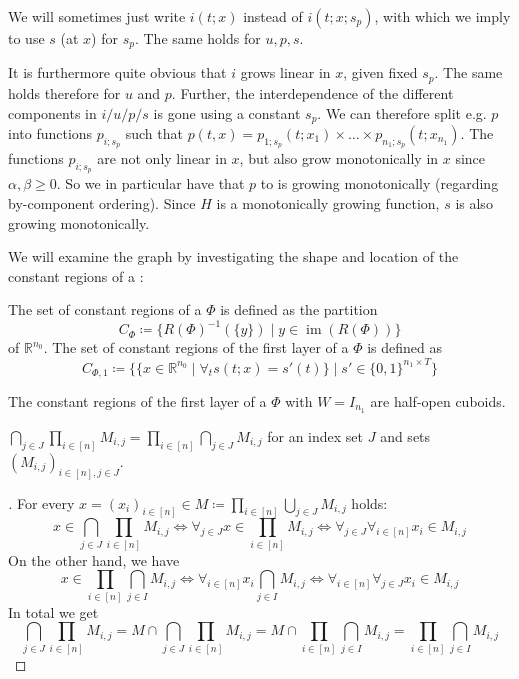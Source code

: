 \begin{remark}\label{rem:regions-non-recursive-defs}
  We will sometimes just write \(i(t;x)\) instead of \(i(t;x;s_p)\), with which we imply to use \(s\) (at \(x\)) for \(s_p\). The same holds for \(u,p,s\).

  It is furthermore quite obvious that \(i\) grows linear in \(x\), given fixed \(s_p\). The same holds therefore for \(u\) and \(p\). Further, the interdependence of the different components in \(i/u/p/s\) is gone using a constant \(s_p\). We can therefore split e.g. \(p\) into functions \(p_{i;s_p}\) such that \(p(t,x)=p_{1;s_p}(t;x_1)×…×p_{n_1;s_p}(t;x_{n_1})\).
  The functions \(p_{i;s_p}\) are not only linear in \(x\), but also grow monotonically in \(x\) since \(α,β≥0\).
  So we in particular have that \(p\) to is growing monotonically (regarding by-component ordering).
  Since \(H\) is a monotonically growing function, \(s\) is also growing monotonically.
\end{remark}
We will examine the graph by investigating the shape and location of the constant regions of a \dtlifsnn:

\begin{definition}
  The set of constant regions of a \dtlifsnn \(Φ\) is defined as the partition
  \[ C_Φ≔\{R(Φ)^{-1}(\{y\})\mid y∈\operatorname{im}(R(Φ))\} \]
  of \(ℝ^{n_0}\). The set of constant regions of the first layer of a \dtlifsnn \(Φ\) is defined as
  \[ C_{Φ,1}≔\{\{x∈ℝ^{n_0}\mid∀_ts(t;x)=s'(t)\}\mid s'∈\{0,1\}^{n_1×T}\} \]
\end{definition}


\begin{proposition}\label{prop:const-regions-cuboids}
  The constant regions of the first layer of a \dtlifsnn \(Φ\) with \(W=I_{n_1}\) are half-open cuboids.
\end{proposition}

\begin{lemma}\label{lem:intersection-and-product}
  \(\bigcap_{j∈J}\prod_{i∈[n]}M_{i,j}=\prod_{i∈[n]}\bigcap_{j∈J}M_{i,j}\) for an index set \(J\) and sets \((M_{i,j})_{i∈[n],j∈J}\).
\end{lemma}

\begin{proof}[]
  For every \(x=(x_i)_{i∈[n]}∈M≔\prod_{i∈[n]}\bigcup_{j∈J}M_{i,j}\) holds:
  \begin{equation*}
   x∈\bigcap_{j∈J}\prod_{i∈[n]}M_{i,j}⇔∀_{j∈J}x∈\prod_{i∈[n]}M_{i,j} ⇔∀_{j∈J}∀_{i∈[n]}x_i∈M_{i,j}
  \end{equation*}
  On the other hand, we have
  \begin{equation*}
    x∈\prod_{i∈[n]}\bigcap_{j∈I}M_{i,j}⇔∀_{i∈[n]}x_i\bigcap_{j∈I}M_{i,j}⇔∀_{i∈[n]}∀_{j∈J}x_i∈M_{i,j}
  \end{equation*}
  In total we get
  \[ \bigcap_{j∈J}\prod_{i∈[n]}M_{i,j}=M∩\bigcap_{j∈J}\prod_{i∈[n]}M_{i,j}=M∩\prod_{i∈[n]}\bigcap_{j∈I}M_{i,j}=\prod_{i∈[n]}\bigcap_{j∈I}M_{i,j} \]
\end{proof}

